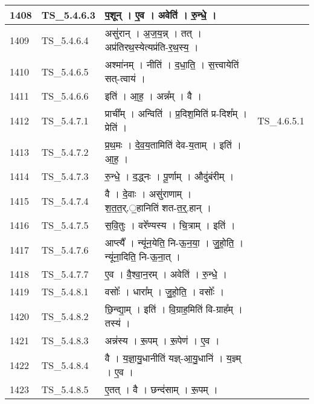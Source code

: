 \documentclass[17pt]{extarticle}
\begin{document}
\begin{longtable}{||p{0.4in}||p{0.9in}||p{4.0in}||p{0.9in}||}
        \hline
            1408 & TS\_5.4.6.3 & प॒शून्   ।   ए॒व   ।   अवेति॑   ।   रु॒न्धे॒   ।    &      \\
        \hline
            1409 & TS\_5.4.6.4 & असु॑रान्   ।   अ॒ज॒य॒न्न्   ।   तत्   ।   अप्र॑तिरथ॒स्येत्यप्र॑ति{-}र॒थ॒स्य॒   ।    &      \\
        \hline
            1410 & TS\_5.4.6.5 & अश्मा॑नम्   ।   नीति॑   ।   द॒धा॒ति॒   ।   स॒त्त्वायेति॑ सत्{-}त्वाय॑   ।    &      \\
        \hline
            1411 & TS\_5.4.6.6 & इति॑   ।   आ॒ह॒   ।   अन्न᳚म्   ।   वै   ।    &      \\
        \hline
            1412 & TS\_5.4.7.1 & प्राची᳚म्   ।   अन्विति॑   ।   प्र॒दिश॒मिति॑ प्र{-}दिश᳚म्   ।   प्रेति॑   ।    & TS\_4.6.5.1        \\
        \hline
            1413 & TS\_5.4.7.2 & प्र॒थ॒मः   ।   दे॒व॒य॒तामिति॑ देव{-}य॒ताम्   ।   इति॑   ।   आ॒ह॒   ।    &      \\
        \hline
            1414 & TS\_5.4.7.3 & रु॒न्धे॒   ।   द॒द्ध्नः   ।   पू॒र्णाम्   ।   औदु॑बंरीम्   ।    &      \\
        \hline
            1415 & TS\_5.4.7.4 & वै   ।   दे॒वाः   ।   असु॑राणाम्   ।   श॒त॒त॒र्.॒हानिति॑ शत{-}त॒र्॒.हान्   ।    &      \\
        \hline
            1416 & TS\_5.4.7.5 & स॒वि॒तुः   ।   वरे᳚ण्यस्य   ।   चि॒त्राम्   ।   इति॑   ।    &      \\
        \hline
            1417 & TS\_5.4.7.6 & आप्त्यै᳚   ।   न्यू॑न॒येति॒ नि{-}ऊ॒न॒या॒   ।   जु॒हो॒ति॒   ।   न्यू॑ना॒दिति॒ नि{-}ऊ॒ना॒त्   ।    &      \\
        \hline
            1418 & TS\_5.4.7.7 & ए॒व   ।   वै॒श्वा॒न॒रम्   ।   अवेति॑   ।   रु॒न्धे॒   ।    &      \\
        \hline
            1419 & TS\_5.4.8.1 & वसोः᳚   ।   धारा᳚म्   ।   जु॒हो॒ति॒   ।   वसोः᳚   ।    &      \\
        \hline
            1420 & TS\_5.4.8.2 & छि॒न्द्या॒म्   ।   इति॑   ।   वि॒ग्राह॒मिति॑ वि{-}ग्राह᳚म्   ।   तस्य॑   ।    &      \\
        \hline
            1421 & TS\_5.4.8.3 & अन्न॑स्य   ।   रू॒पम्   ।   रू॒पेण॑   ।   ए॒व   ।    &      \\
        \hline
            1422 & TS\_5.4.8.4 & वै   ।   य॒ज्ञा॒यु॒धानीति॑ यज्ञ्{-}आ॒यु॒धानि॑   ।   य॒ज्ञ्म्   ।   ए॒व   ।    &      \\
        \hline
            1423 & TS\_5.4.8.5 & ए॒तत्   ।   वै   ।   छन्द॑साम्   ।   रू॒पम्   ।    &      \\

\end{longtable}
\end{document}

